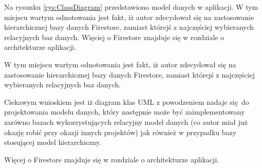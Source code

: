Na rysunku \ref{rys:ClassDiagram} przedstawiono model danych w aplikacji.
W tym miejscu wartym odnotowania jest fakt, iż autor zdecydował się
na zastosowanie hierarchicznej bazy danych Firestore, zamiast którejś z najczęściej
wybieranych relacyjnych baz danych.
Więciej o Firestore znajduje się w rozdziale o architekturze aplikacji.

W tym miejscu wartym odnotowania jest fakt, iż autor zdecydował się
na zastosowanie hierarchicznej bazy danych Firestore, zamiast którejś z najczęściej
wybieranych relacyjnych baz danych.

Ciekawym wnioskiem jest iż diagram klas UML z powodzeniem nadaje się do projektowania
modelu danych, który następnie może być zaimplementowany zarówno bazach
wykorzystujących relacyjny model danych (co autor miał już okazję robić
przy okazji innych projektów) jak również w przypadku bazy stosującej
model hierarchiczny.

Więcej o Firestore znajduje się w rozdziale o architekturze aplikacji.
